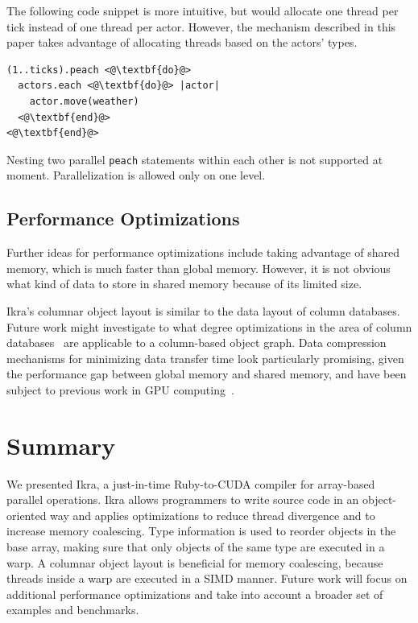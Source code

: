 \documentclass[preprint]{sigplanconf}
\begin{document}
The following code snippet is more intuitive, but would allocate one thread per tick instead of one thread per actor. However, the mechanism described in this paper takes advantage of allocating threads based on the actors' types.
\begin{lstlisting}
(1..ticks).peach <@\textbf{do}@>
  actors.each <@\textbf{do}@> |actor|
    actor.move(weather)
  <@\textbf{end}@>
<@\textbf{end}@>
\end{lstlisting}

Nesting two parallel \texttt{peach} statements within each other is not supported at moment. Parallelization is allowed only on one level.

\subsection{Performance Optimizations}
Further ideas for performance optimizations include taking advantage of shared memory, which is much faster than global memory. However, it is not obvious what kind of data to store in shared memory because of its limited size.

Ikra's columnar object layout is similar to the data layout of column databases. Future work might investigate to what degree optimizations in the area of column databases~\cite{DBLP:journals/ftdb/AbadiBHIM13, DBLP:journals/corr/LinMPS16} are applicable to a column-based object graph. Data compression mechanisms for minimizing data transfer time look particularly promising, given the performance gap between global memory and shared memory, and have been subject to previous work in GPU computing~\cite{Patel:2012:PLD, Przymus2012}.


\section{Summary}
We presented Ikra, a just-in-time Ruby-to-CUDA compiler for array-based parallel operations. Ikra allows programmers to write source code in an object-oriented way and applies optimizations to reduce thread divergence and to increase memory coalescing. Type information is used to reorder objects in the base array, making sure that only objects of the same type are executed in a warp. A columnar object layout is beneficial for memory coalescing, because threads inside a warp are executed in a SIMD manner. Future work will focus on additional performance optimizations and take into account a broader set of examples and benchmarks.
\end{document}
